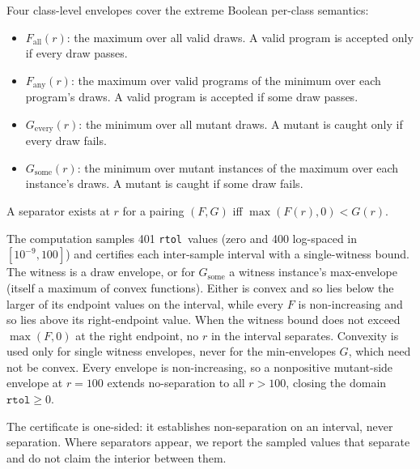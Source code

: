 \documentclass[twocolumn,10pt]{article}
\newcommand{\rtol}{\texttt{rtol}}
\begin{document}
Four class-level envelopes cover the extreme Boolean per-class
semantics:

\begin{itemize}
\item $F_{\mathrm{all}}(r)$: the maximum over all valid draws. A valid
program is accepted only if every draw passes.
\item $F_{\mathrm{any}}(r)$: the maximum over valid programs of the
minimum over each program's draws. A valid program is accepted if some
draw passes.
\item $G_{\mathrm{every}}(r)$: the minimum over all mutant draws. A
mutant is caught only if every draw fails.
\item $G_{\mathrm{some}}(r)$: the minimum over mutant instances of the
maximum over each instance's draws. A mutant is caught if some draw
fails.
\end{itemize}

A separator exists at $r$ for a pairing $(F, G)$ iff
$\max(F(r), 0) < G(r)$.

The computation samples 401 \rtol\ values (zero and 400 log-spaced in
$[10^{-9}, 100]$) and certifies each inter-sample interval with a
single-witness bound. The witness is a draw envelope, or for
$G_{\mathrm{some}}$ a witness instance's max-envelope (itself a maximum
of convex functions). Either is convex and so lies below the larger of
its endpoint values on the interval, while every $F$ is non-increasing
and so lies above its right-endpoint value. When the witness bound does
not exceed $\max(F, 0)$ at the right endpoint, no $r$ in the interval
separates. Convexity is used only for single witness envelopes, never
for the min-envelopes $G$, which need not be convex. Every envelope is
non-increasing, so a nonpositive mutant-side envelope at $r = 100$
extends no-separation to all $r > 100$, closing the domain $\rtol\ge0$.

The certificate is one-sided: it establishes non-separation on an
interval, never separation. Where separators appear, we report the
sampled values that separate and do not claim the interior between them.
\end{document}
